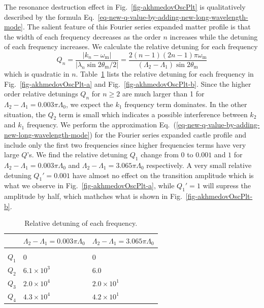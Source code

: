 \documentclass[%
reprint,
 amsmath,amssymb,
 aps,
]{revtex4-1}
\begin{document}
The resonance destruction effect in Fig.~\ref{fig-akhmedovOscPlt} is qualitatively described by the formula Eq.~\ref{eq-new-q-value-by-adding-new-long-wavelength-mode}. The salient feature of this Fourier series expanded matter profile is that the width of each frequency decreases as the order $n$ increases while the detuning of each frequency increases. We calculate the relative detuning for each frequency
\begin{equation}
Q_n = \frac{\lvert k_n -\omega_{\mathrm m} \rvert}{ \lvert \lambda_n  \sin 2\theta_{\mathrm m}/2 \rvert } = \frac{2(n-1)(2n-1)\pi \omega_{\mathrm m}}{(\Lambda_2 - \Lambda_1)\sin 2\theta_{\mathrm m}}
\end{equation}
which is quadratic in $n$. Table~\ref{tab-q-values-each-mode} lists the relative detuning for each frequency in Fig.~\ref{fig-akhmedovOscPlt-a} and Fig.~\ref{fig-akhmedovOscPlt-b}. Since the higher order relative detunings $Q_n$ for $n\geq 2$ are much larger than 1 for $\Lambda_2-\Lambda_1 = 0.003\pi\Lambda_0$, we expect the $k_1$ frequency term dominates. In the other situation, the $Q_2$ term is small which indicates a possible interference between $k_2$ and $k_1$ frequency. We perform the approximation Eq.~(\ref{eq-new-q-value-by-adding-new-long-wavelength-mode}) for the Fourier series expanded castle profile and include only the first two frequencies since higher frequencies terms have very large $Q$'s. We find the relative detuning $Q_1$ change from $0$ to $0.001$ and $1$ for $\Lambda_2-\Lambda_1 = 0.003\pi\Lambda_0$ and $\Lambda_2-\Lambda_1 =3.065\pi\Lambda_0$ respectively. A very small relative detuning $Q_1'=0.001$ have almost no effect on the transition amplitude which is what we observe in Fig.~\ref{fig-akhmedovOscPlt-a}, while $Q_1'=1$ will supress the amplitude by half, which mathches what is shown in Fig.~\ref{fig-akhmedovOscPlt-b}.




\begin{table}
\caption{\label{tab-q-values-each-mode}Relative detuning of each frequency.} 
\begin{ruledtabular} 
\begin{tabular}{lll} 
  & $\Lambda_2-\Lambda_1 = 0.003\pi\Lambda_0$ & $\Lambda_2-\Lambda_1 =3.065\pi\Lambda_0$ \\
\hline \\
 $Q_1$ & $0$ &  $0$ \\ 
 $Q_2$ & $6.1\times 10^3$ &  $6.0$ \\ 
 $Q_3$ & $2.0\times 10^4$ &  $2.0\times 10^1$ \\ 
 $Q_4$ & $4.3\times 10^4$ &  $4.2\times 10^1$ 
\end{tabular} 
\end{ruledtabular} 
\end{table}
\end{document}
